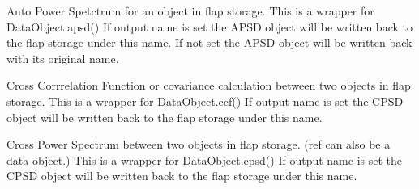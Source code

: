 \documentclass[letterpaper,10pt,english]{sphinxmanual}
\begin{document}

\begin{fulllineitems}
\label{\detokenize{data_object:flap.data_object.apsd}}
Auto Power Spetctrum for an object in flap storage. This is a wrapper for DataObject.apsd()
If output name is set the APSD object will be written back to the flap storage under this name.
If not set the APSD object will be written back with its original name.

\end{fulllineitems}


\begin{fulllineitems}
\label{\detokenize{data_object:flap.data_object.ccf}}
Cross Corrrelation Function or covariance calculation between two objects in flap storage.
This is a wrapper for DataObject.ccf()
If output name is set the CPSD object will be written back to the flap storage under this name.

\end{fulllineitems}


\begin{fulllineitems}
\label{\detokenize{data_object:flap.data_object.cpsd}}
Cross Power Spectrum between two objects in flap storage. (ref can also be a data object.)
This is a wrapper for DataObject.cpsd()
If output name is set the CPSD object will be written back to the flap storage under this name.

\end{fulllineitems}
\end{document}
